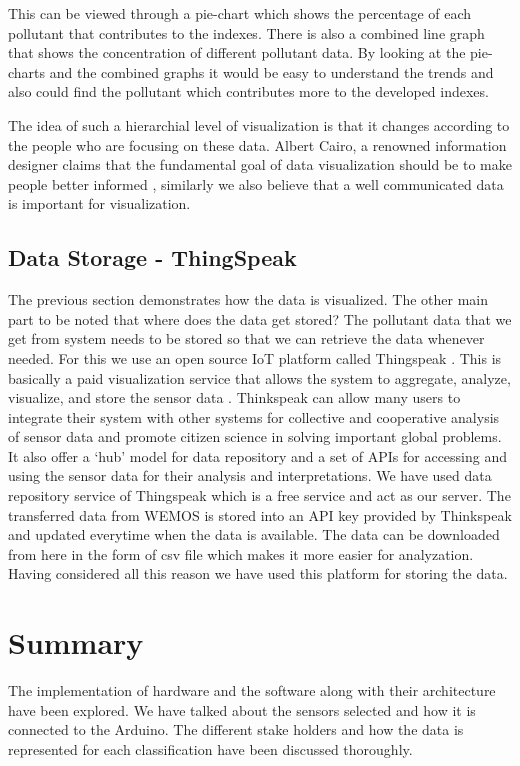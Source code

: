This can be viewed through a pie-chart which shows the percentage of each pollutant that contributes to the indexes.  There is also a combined line graph that shows the concentration of different pollutant data. By looking at the pie-charts and the combined graphs it would be easy to understand the trends and also could find the pollutant which contributes more to the developed indexes. 

The idea of such a hierarchial level of visualization is that it changes according to the people who are focusing on these data. Albert Cairo, a renowned information designer claims that the fundamental goal of data visualization should be to make people better informed \cite{Hepworth} \cite{Cairo2014},  similarly we also believe that a well communicated data is important for visualization.


\subsection{Data Storage - ThingSpeak}

The previous section demonstrates how the data is visualized. The other main part to be noted that where does the data get stored? The pollutant data that we get from system needs to be stored so that we can retrieve the data whenever needed. For this we use an open source IoT platform called Thingspeak \cite{thingspeak}. This is basically a paid visualization service that allows the system to aggregate, analyze, visualize, and store the sensor data \cite{thingspeak}. Thinkspeak can allow many users to integrate their system with other systems for collective and cooperative analysis of sensor data and promote citizen science in solving important global problems. It also offer a ‘hub’ model for data repository and a set of APIs for accessing and using the sensor data for their analysis and interpretations. We have used data repository service of Thingspeak which is a free service and act as our server. The transferred data from WEMOS is stored into an API key provided by Thinkspeak and updated everytime when the data is available. The data can be downloaded from here in the form of csv file which makes it more easier for analyzation. Having considered all this reason we have used this platform for storing the data.

\section{Summary}

The implementation of hardware and the software along with their architecture have been explored. We have talked about the sensors selected and how it is connected to the Arduino. The different stake holders and how the data is represented for each classification have been discussed thoroughly.

